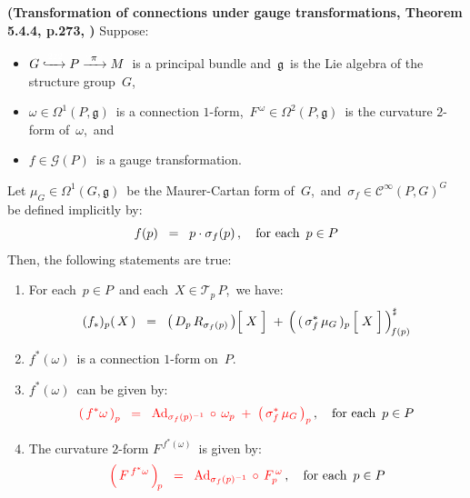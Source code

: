 \vskip 0.5cm
\begin{theorem}\textnormal{\bf(Transformation of connections under gauge transformations, Theorem 5.4.4, p.273, \cite{Hamilton2017})}
\label{ConnectionTransformationLaw}
\mbox{}
\vskip 0.1cm
\noindent
Suppose:
\begin{itemize}
\item
	\vskip -0.1cm
	$G \xhookrightarrow{{\color{white}222}} P \xrightarrow{{\color{white}2}\pi{\color{white}2}} M$\,
	is a principal bundle and \,$\mathfrak{g}$\, is the Lie algebra of the structure group \,$G$,
\item
	$\omega \in \Omega^{1}(P,\mathfrak{g})$\, is a connection $1$-form,\,
	$F^{\,\omega} \in \Omega^{2}(P,\mathfrak{g})$\, is the curvature $2$-form of \,$\omega$,\,
	and
\item
	$f \in \mathscr{G}(P)$\, is a gauge transformation.
\end{itemize}
Let \;$\mu_{G} \in \Omega^{1}(G,\mathfrak{g})$\, be the Maurer-Cartan form of \,$G$,\, and
\,$\sigma_{f} \in \mathscr{C}^{\infty}(P,G)^{G}$\,
be defined implicitly by:
\begin{equation*}
f(p)
\;\; = \;\;
	p \cdot \sigma_{f}(p)\,,
\quad
\textnormal{for each \,$p \in P$}
\end{equation*}
Then, the following statements are true:
\begin{enumerate}
\item
	For each \,$p \in P$\, and each \,$X \in \mathcal{T}_{p}\,P$,\, we have:
	\begin{equation*}
	(f_{*})_{p}(\,X\,)
	\;\; = \;\;
		\left(\,D_{p}\,R_{\sigma_{f}(p)}\,\right)\!\left[\;\overset{{\color{white}.}}{X}\;\right]
		\; + \,
		\left(\,
			(\,\sigma_{f}^{*}\,\mu_{G}\,)_{p}
			\left[\;\overset{{\color{white}.}}{X}\;\right]
			\,\right)^{\sharp}_{\!f(p)}
	\end{equation*}
\item
	$f^{*}(\omega)$\, is a connection $1$-form on \,$P$.
\item
	$f^{*}(\omega)$\, can be given by:
	\begin{equation*}
	{\color{red}
	\left(\,f^{*}\omega\,\right)_{p}
	\;\; = \;\;
		\textnormal{Ad}_{\sigma_{f}(p)^{-1}}\,\circ\,\omega_{p}
		\; + \;
		\left(\,\sigma_{f}^{*}\,\mu_{G}\,\right)_{p}
		}\,,
	\quad
	\textnormal{for each \,$p \in P$}
	\end{equation*}
\item
	The curvature $2$-form \;$F^{\,f^{*}(\omega)}$\, is given by:
	\begin{equation*}
	{\color{red}
	\left(\,F^{\,f^{*}\omega}\,\right)_{\!p}
	\;\; = \;\;
		\textnormal{Ad}_{\sigma_{f}(p)^{-1}} \,\circ\, F^{\,\omega}_{p}
		}\,,
	\quad
	\textnormal{for each \,$p \in P$}
	\end{equation*}
\end{enumerate}
\end{theorem}
